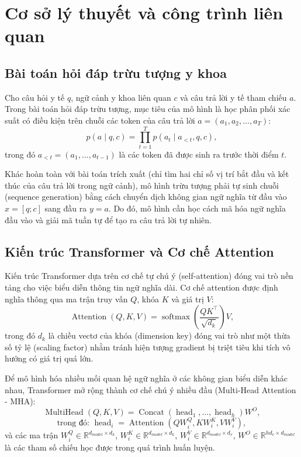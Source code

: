 \chapter{Cơ sở lý thuyết và công trình liên quan}
\section{Bài toán hỏi đáp trừu tượng y khoa}
Cho câu hỏi y tế $q$, ngữ cảnh y khoa liên quan $c$ và câu trả lời y tế tham chiếu $a$. Trong bài toán hỏi đáp trừu tượng, mục tiêu của mô hình là học phân phối xác suất có điều kiện trên chuỗi các token của câu trả lời $a = (a_1, a_2, \dots, a_T)$:
\begin{equation}
  p(a \mid q, c) = \prod_{t=1}^{T} p(a_t \mid a_{<t}, q, c),
\end{equation}
trong đó $a_{<t} = (a_1, \dots, a_{t-1})$ là các token đã được sinh ra trước thời điểm $t$. 

Khác hoàn toàn với bài toán trích xuất (chỉ tìm hai chỉ số vị trí bắt đầu và kết thúc của câu trả lời trong ngữ cảnh), mô hình trừu tượng phải tự sinh chuỗi (sequence generation) bằng cách chuyển dịch không gian ngữ nghĩa từ đầu vào $x = [q; c]$ sang đầu ra $y = a$. Do đó, mô hình cần học cách mã hóa ngữ nghĩa đầu vào và giải mã tuần tự để tạo ra câu trả lời tự nhiên.

\section{Kiến trúc Transformer và Cơ chế Attention}
Kiến trúc Transformer \cite{vaswani2017attention} dựa trên cơ chế tự chú ý (self-attention) đóng vai trò nền tảng cho việc biểu diễn thông tin ngữ nghĩa dài. Cơ chế attention được định nghĩa thông qua ma trận truy vấn $Q$, khóa $K$ và giá trị $V$:
\begin{equation}
  \operatorname{Attention}(Q, K, V) = \operatorname{softmax}\left(\frac{QK^\top}{\sqrt{d_k}}\right)V,
\end{equation}
trong đó $d_k$ là chiều vectơ của khóa (dimension key) đóng vai trò như một thừa số tỷ lệ (scaling factor) nhằm tránh hiện tượng gradient bị triệt tiêu khi tích vô hướng có giá trị quá lớn.

Để mô hình hóa nhiều mối quan hệ ngữ nghĩa ở các không gian biểu diễn khác nhau, Transformer mở rộng thành cơ chế chú ý nhiều đầu (Multi-Head Attention - MHA):
\begin{equation}
  \operatorname{MultiHead}(Q, K, V) = \operatorname{Concat}(\operatorname{head}_1, \dots, \operatorname{head}_h)W^O,
\end{equation}
\begin{equation}
  \text{trong đó: } \operatorname{head}_i = \operatorname{Attention}(QW_i^Q, KW_i^K, VW_i^V),
\end{equation}
và các ma trận $W_i^Q \in \mathbb{R}^{d_{model} \times d_k}$, $W_i^K \in \mathbb{R}^{d_{model} \times d_k}$, $W_i^V \in \mathbb{R}^{d_{model} \times d_v}$, $W^O \in \mathbb{R}^{h d_v \times d_{model}}$ là các tham số chiếu học được trong quá trình huấn luyện.


